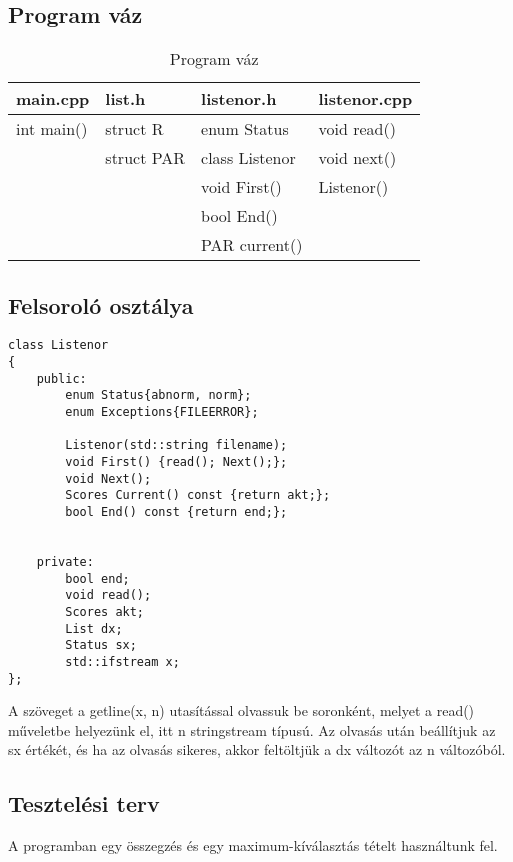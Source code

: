 \documentclass[a4paper]{article}
\begin{document}
	\subsection{Program váz}
	\begin{table}[h!]
		\caption{Program váz}
		\begin{center}			
			\label{tab:programvaz}
			\begin{tabular}{l|l|l|l}
				\textbf{main.cpp} & \textbf{list.h} & \textbf{listenor.h} & \textbf{listenor.cpp}\\
				\hline
				int main() & struct R  &enum Status & void read()\\
				 & struct PAR &  class Listenor & void next()\\
				& & void First() & Listenor() \\
				& & bool End() \\
				& & PAR current()				
			\end{tabular}
		\end{center}
	\end{table}
	\subsection{Felsoroló osztálya}
	\begin{lstlisting}
class Listenor
{
	public:
		enum Status{abnorm, norm};
		enum Exceptions{FILEERROR};
	
		Listenor(std::string filename);
		void First() {read(); Next();};
		void Next();
		Scores Current() const {return akt;};
		bool End() const {return end;};
	
	
	private:
		bool end;
		void read();
		Scores akt;
		List dx;
		Status sx;
		std::ifstream x;
};
	\end{lstlisting}
	A szöveget a getline(x, n) utasítással olvassuk be soronként, melyet a read() műveletbe helyezünk el, itt n stringstream típusú. Az olvasás után beállítjuk az sx értékét, és ha az olvasás sikeres, akkor feltöltjük a dx változót az n változóból. \\
	
	\subsection{Tesztelési terv}
	A programban egy összegzés és egy maximum-kíválasztás tételt használtunk fel.
	
\end{document}
